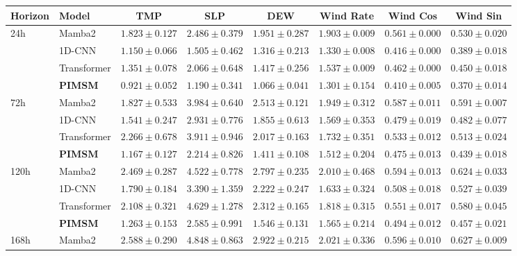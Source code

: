 \documentclass{article}
\begin{document}
\begin{table}[htbp]
\centering
\scriptsize
\setlength{\tabcolsep}{1.1pt}
\begin{tabular}{llcccccc}
\toprule
Horizon & Model & TMP & SLP & DEW & Wind Rate & Wind Cos & Wind Sin \\
\midrule
24h & Mamba2      & $1.823\pm0.127$ & $2.486\pm0.379$ & $1.951\pm0.287$ & $1.903\pm0.009$ & $0.561\pm0.000$ & $0.530\pm0.020$ \\
    & 1D-CNN      & $1.150\pm0.066$ & $1.505\pm0.462$ & $1.316\pm0.213$ & $1.330\pm0.008$ & $0.416\pm0.000$ & $0.389\pm0.018$ \\
    & Transformer & $1.351\pm0.078$ & $2.066\pm0.648$ & $1.417\pm0.256$ & $1.537\pm0.009$ & $0.462\pm0.000$ & $0.450\pm0.018$ \\
    & \textbf{PIMSM} & $\mathbf{0.921\pm0.052}$ & $\mathbf{1.190\pm0.341}$ & $\mathbf{1.066\pm0.041}$ & $\mathbf{1.301\pm0.154}$ & $\mathbf{0.410\pm0.005}$ & $\mathbf{0.370\pm0.014}$ \\
\midrule
72h & Mamba2      & $1.827\pm0.533$ & $3.984\pm0.640$ & $2.513\pm0.121$ & $1.949\pm0.312$ & $0.587\pm0.011$ & $0.591\pm0.007$ \\
    & 1D-CNN      & $1.541\pm0.247$ & $2.931\pm0.776$ & $1.855\pm0.613$ & $1.569\pm0.353$ & $0.479\pm0.019$ & $0.482\pm0.077$ \\
    & Transformer & $2.266\pm0.678$ & $3.911\pm0.946$ & $2.017\pm0.163$ & $1.732\pm0.351$ & $0.533\pm0.012$ & $0.513\pm0.024$ \\
    & \textbf{PIMSM} & $\mathbf{1.167\pm0.127}$ & $\mathbf{2.214\pm0.826}$ & $\mathbf{1.411\pm0.108}$ & $\mathbf{1.512\pm0.204}$ & $\mathbf{0.475\pm0.013}$ & $\mathbf{0.439\pm0.018}$ \\
\midrule
120h & Mamba2      & $2.469\pm0.287$ & $4.522\pm0.778$ & $2.797\pm0.235$ & $2.010\pm0.468$ & $0.594\pm0.013$ & $0.624\pm0.033$ \\
     & 1D-CNN      & $1.790\pm0.184$ & $3.390\pm1.359$ & $2.222\pm0.247$ & $1.633\pm0.324$ & $0.508\pm0.018$ & $0.527\pm0.039$ \\
     & Transformer & $2.108\pm0.321$ & $4.629\pm1.278$ & $2.312\pm0.165$ & $1.818\pm0.315$ & $0.551\pm0.017$ & $0.580\pm0.045$ \\
     & \textbf{PIMSM} & $\mathbf{1.263\pm0.153}$ & $\mathbf{2.585\pm0.991}$ & $\mathbf{1.546\pm0.131}$ & $\mathbf{1.565\pm0.214}$ & $\mathbf{0.494\pm0.012}$ & $\mathbf{0.457\pm0.021}$ \\
\midrule
168h & Mamba2      & $2.588\pm0.290$ & $4.848\pm0.863$ & $2.922\pm0.215$ & $2.021\pm0.336$ & $0.596\pm0.010$ & $0.627\pm0.009$ \\

\end{tabular}
\end{table}
\end{document}
